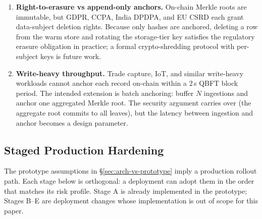 \documentclass[10pt,twocolumn]{article}
\begin{document}
\begin{enumerate}[leftmargin=*,topsep=3pt,itemsep=2pt]
\item \textbf{Right-to-erasure vs append-only anchors.}
  On-chain Merkle roots are immutable, but GDPR, CCPA, India
  DPDPA, and EU CSRD each grant data-subject deletion rights.
  Because only hashes are anchored, deleting a row from the warm
  store and rotating the storage-tier key satisfies the
  regulatory erasure obligation in practice; a formal
  crypto-shredding protocol with per-subject keys is future work.

\item \textbf{Write-heavy throughput.}
  Trade capture, IoT, and similar write-heavy workloads cannot
  anchor each record on-chain within a 2\,s QBFT block period.
  The intended extension is batch anchoring: buffer $N$
  ingestions and anchor one aggregated Merkle root. The security
  argument carries over (the aggregate root commits to all
  leaves), but the latency between ingestion and anchor becomes a
  design parameter.
\end{enumerate}

\subsection{Staged Production Hardening}
\label{sec:stages}

The prototype assumptions in \S\ref{sec:arch-vs-prototype} imply a
production rollout path. Each stage below is orthogonal: a
deployment can adopt them in the order that matches its risk
profile. Stage A is already implemented in the prototype; Stages
B--E are deployment changes whose implementation is out of scope
for this paper.
\end{document}
